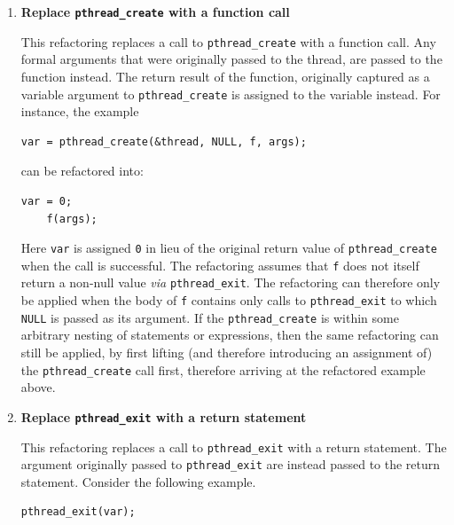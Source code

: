 \begin{enumerate}

\item \textbf{Replace \lstinline|pthread_create| with a function call}

This refactoring replaces a call to \lstinline|pthread_create| with a function call. Any formal arguments that were originally passed to the thread, are passed to the function instead. The return result of the function, originally captured as a variable argument to \lstinline|pthread_create| is assigned to the variable instead. For instance, the example 


	\begin{lstlisting}[frame=single]
	var = pthread_create(&thread, NULL, f, args);
	\end{lstlisting}

can be refactored into:


	\begin{lstlisting}[frame=single]
	var = 0;
	f(args);
	\end{lstlisting}


Here \texttt{var} is assigned \texttt{0} in lieu of the original return value of \lstinline|pthread_create| when the call is successful. The refactoring assumes that \lstinline|f| 
does not itself return a non-null value \emph{via} \lstinline|pthread_exit|. The refactoring can therefore only be applied when the body of \lstinline|f| contains only calls to \lstinline|pthread_exit| to which \lstinline|NULL| is passed as its argument. %
If the \lstinline{pthread_create} is within some arbitrary nesting of statements or expressions, then the same refactoring can still be applied, by first lifting (and therefore introducing an assignment of) the \lstinline{pthread_create} call first, therefore arriving at the refactored example above.

\item \textbf{Replace \lstinline|pthread_exit| with a return statement}

This refactoring replaces a call to \lstinline|pthread_exit| with a return statement. The argument originally passed to \lstinline|pthread_exit| are instead passed to the return statement. Consider the following example.

\begin{lstlisting}[frame=single]
pthread_exit(var);
\end{lstlisting}


\end{enumerate}
